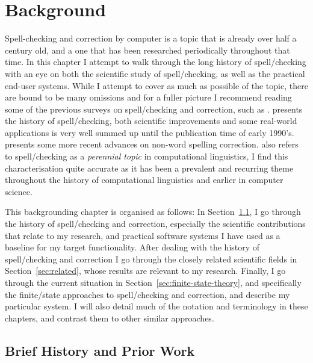 \documentclass[officiallayout]{unihelcompling}
\begin{document}
\chapter{Background}
\label{chap:background}

Spell-checking and correction by computer is a topic that is already over half
a century old, and a one that has been researched periodically throughout that
time.  In this chapter I attempt to walk through the long history of
spell\-/checking with an eye on both the scientific study of spell\-/checking,
as well as the practical end-user systems. While I attempt to cover as
much as possible of the topic, there are bound to be many omissions and for
a fuller picture I recommend reading some of the previous surveys on
spell\-/checking and correction, such as
\citet{kukich1992spelling,mitton2009ordering}.  \citet{kukich1992spelling}
presents
the history of spell\-/checking, both scientific improvements and some
real-world applications is very well summed up until the publication time of
early 1990's.  \citet{mitton2009ordering} presents some more recent advances on
non-word spelling correction.  \citet{kukich1992spelling} also refers to
spell\-/checking as a \emph{perennial topic} in computational linguistics, I
find this characterisation quite accurate as it has been a prevalent and
recurring theme throughout the history of computational linguistics and earlier
in computer science.


This backgrounding chapter is organised as follows: In
Section~\ref{sec:history}, I go through the history of spell\-/checking and
correction, especially the scientific contributions that relate to my research,
and practical software systems I have used as a baseline for my target
functionality.  After dealing with the history of spell\-/checking and
correction I go through the closely related scientific fields in
Section~\ref{sec:related}, whose results are relevant to my research. Finally,
I go through the current situation in Section~\ref{sec:finite-state-theory},
and specifically the finite\-/state approaches to spell\-/checking and
correction, and describe my particular system. I will also detail much of the
notation and terminology in these chapters, and contrast them to other similar
approaches.

\section{Brief History and Prior Work}
\label{sec:history}
\end{document}
